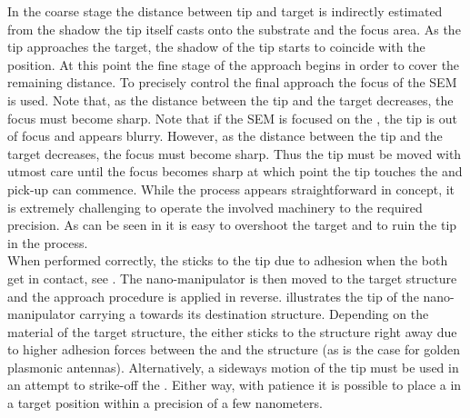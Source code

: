 	In the coarse stage the distance between tip and target \nd is indirectly estimated from the shadow the tip itself casts onto the substrate and the focus area. As the tip approaches the target, the shadow of the tip starts to coincide with the \nd position. At this point the fine stage of the approach begins in order to cover the remaining distance. To precisely control the final approach the focus of the SEM is used. Note that, as the distance between the tip and the target decreases, the focus must become sharp. Note that if the SEM is focused on the \nd, the tip is out of focus and appears blurry. However, as the distance between the tip and the target decreases, the focus must become sharp. Thus the tip must be moved with utmost care until the focus becomes sharp at which point the tip touches the \nd and pick-up can commence. While the process appears straightforward in concept, it is extremely challenging to operate the involved machinery to the required precision. As can be seen in  it is easy to overshoot the target and to ruin the tip in the process.
	\\
	When performed correctly, the \nd sticks to the tip due to adhesion when the both get in contact, see .
	The nano-manipulator is then moved to the target structure and the approach procedure is applied in reverse.  illustrates the tip of the nano-manipulator carrying a \nd towards its destination structure.
	Depending on the material of the target structure, the \nd either sticks to the structure right away due to higher adhesion forces between the \nd and the structure (as is the case for golden plasmonic antennas).
	Alternatively, a sideways motion of the \np tip must be used in an attempt to strike-off the \nd.
	Either way, with patience it is possible to place a \nd in a target position within a precision of a few nanometers.
	\\

